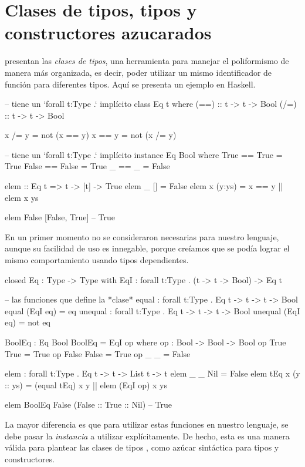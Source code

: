 {\section{Clases de tipos, tipos y constructores azucarados}

\begin{investigationfr}
\textcite{less-ad-hoc-polymorphism} presentan las \emph{clases de tipos}, una herramienta para manejar el poliformismo de manera más organizada, es decir, poder utilizar un mismo identificador de función para diferentes tipos. Aquí se presenta un ejemplo en Haskell.

\begin{haskellcode}
-- tiene un `forall t:Type .` implícito
class Eq t where
    (==) :: t -> t -> Bool
    (/=) :: t -> t -> Bool

    x /= y = not (x == y)
    x == y = not (x /= y)

-- tiene un `forall t:Type .` implícito
instance Eq Bool where
    True == True = True
    False == False = True
    _ == _ = False

elem :: Eq t => t -> [t] -> True
elem _ [] = False
elem x (y:ys) = x == y || elem x ys

elem False [False, True]    -- True
\end{haskellcode}

En un primer momento no se consideraron necesarias para nuestro lenguaje, aunque su facilidad de uso es innegable, porque creíamos que se podía lograr el mismo comportamiento usando tipos dependientes.

\begin{anglercode}
closed Eq : Type -> Type with
    EqI : forall t:Type . (t -> t -> Bool) -> Eq t

-- las funciones que define la *clase*
equal : forall t:Type . Eq t -> t -> t -> Bool
equal (EqI eq) = eq
unequal : forall t:Type . Eq t -> t -> t -> Bool
unequal (EqI eq) = not eq

BoolEq : Eq Bool
BoolEq = EqI op
    where
        op : Bool -> Bool -> Bool
        op True  True  = True
        op False False = True
        op _     _     = False

elem : forall t:Type . Eq t -> t -> List t -> t
elem _         _ Nil = False
elem tEq x (y :: ys) = (equal tEq) x y || elem (EqI op) x ys

elem BoolEq False (False :: True :: Nil)    -- True
\end{anglercode}

La mayor diferencia es que para utilizar estas funciones en nuestro lenguaje, se debe pasar la \emph{instancia} a utilizar explícitamente. De hecho, esta es una manera válida para plantear las clases de tipos \cite{scrap-type-classes}, como azúcar sintáctica para tipos y constructores.
\end{investigationfr}

}
